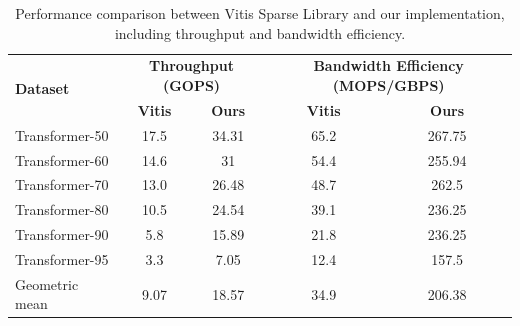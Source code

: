 \documentclass[manuscript,screen,review]{acmart}
\begin{document}
\begin{table}[h!]
	\centering
	\begin{tabular}{|l|c|c|c|c|}
		\hline
		\multirow{2}{*}{\textbf{Dataset}} & \multicolumn{2}{c|}{\textbf{Throughput (GOPS)}} & \multicolumn{2}{c|}{\textbf{Bandwidth Efficiency (MOPS/GBPS)}} \\
		\cline{2-5}
		& \textbf{Vitis} & \textbf{Ours} & \textbf{Vitis} & \textbf{Ours} \\
		\hline
		Transformer-50 & 17.5 & 34.31 & 65.2 & 267.75 \\
		Transformer-60 & 14.6 & 31 & 54.4 & 255.94 \\
		Transformer-70 & 13.0 & 26.48 & 48.7 & 262.5 \\
		Transformer-80 & 10.5 & 24.54 & 39.1 & 236.25 \\
		Transformer-90 & 5.8 & 15.89 & 21.8 & 236.25 \\
		Transformer-95 & 3.3 & 7.05 & 12.4 & 157.5 \\
		\hline
		Geometric mean & 9.07 & 18.57 & 34.9 & 206.38 \\
		\hline
	\end{tabular}
	\caption{Performance comparison between Vitis Sparse Library and our implementation, including throughput and bandwidth efficiency.}
	\label{vsl}
\end{table}
\end{document}
